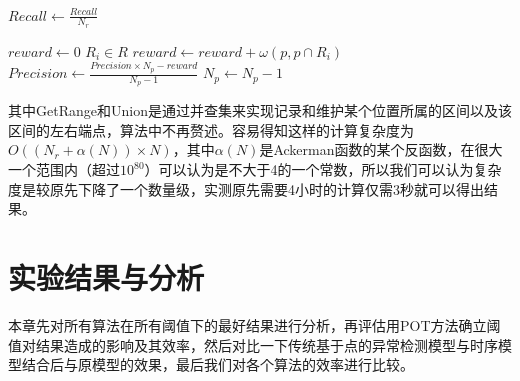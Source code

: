 \begin{breakablealgorithm}
\begin{algorithmic}[1]
      \State

      \State $Recall \gets \frac{Recall}{N_r}$

      \State $reward \gets 0$
      \ForAll $R_i \in R$
            \State $reward \gets reward + \omega(p, p \cap R_i)$
      \EndFor
      \State $Precision \gets \frac{Precision \times N_p - reward}{N_p - 1}$
      \State $N_p \gets N_p - 1$
      \EndFunction
    \end{algorithmic}
  \end{breakablealgorithm}

  其中GetRange和Union是通过并查集来实现记录和维护某个位置所属的区间以及该区间的左右端点，算法中不再赘述。容易得知这样的计算复杂度为$O((N_r + \alpha(N))\times N)$，其中$\alpha(N)$是Ackerman函数的某个反函数，在很大一个范围内（超过$10^{80}$）可以认为是不大于4的一个常数，所以我们可以认为复杂度是较原先下降了一个数量级，实测原先需要4小时的计算仅需3秒就可以得出结果。
\section{实验结果与分析}
本章先对所有算法在所有阈值下的最好结果进行分析，再评估用POT方法确立阈值对结果造成的影响及其效率，然后对比一下传统基于点的异常检测模型与时序模型结合后与原模型的效果，最后我们对各个算法的效率进行比较。
